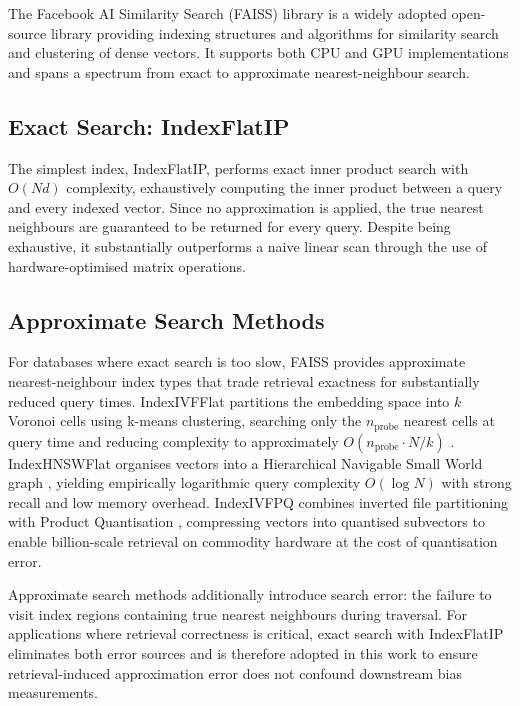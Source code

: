 The Facebook AI Similarity Search (FAISS) library \cite{Douze_2024_FAISS} is a widely
adopted open-source library providing indexing structures and algorithms for similarity
search and clustering of dense vectors. It supports both CPU and GPU implementations and
spans a spectrum from exact to approximate nearest-neighbour search.

\subsection*{Exact Search: IndexFlatIP}
\label{subsec:indexflatip}

The simplest index, IndexFlatIP, performs exact inner product search with $O(Nd)$ complexity, exhaustively computing the inner product between a query and every indexed vector. Since no approximation is applied, the true nearest neighbours are guaranteed to be returned for every query. Despite being exhaustive, it substantially outperforms a naive linear scan through the use of hardware-optimised matrix operations.

\subsection*{Approximate Search Methods}
\label{subsec:ann_methods}

For databases where exact search is too slow, FAISS provides approximate
nearest-neighbour index types that trade retrieval exactness for substantially reduced
query times. IndexIVFFlat partitions the embedding space into $k$ Voronoi cells using
k-means clustering, searching only the $n_\text{probe}$ nearest cells at query time and
reducing complexity to approximately $O(n_\text{probe} \cdot N/k)$
\cite{Jegou_2011_PQ}. IndexHNSWFlat organises vectors into a Hierarchical Navigable
Small World graph \cite{Malkov_2020_HNSW}, yielding empirically logarithmic query
complexity $O(\log N)$ with strong recall and low memory overhead. IndexIVFPQ combines
inverted file partitioning with Product Quantisation \cite{Jegou_2011_PQ}, compressing
vectors into quantised subvectors to enable billion-scale retrieval on commodity
hardware at the cost of quantisation error.

Approximate search methods additionally introduce search error: the failure to visit
index regions containing true nearest neighbours during traversal. For applications
where retrieval correctness is critical, exact search with IndexFlatIP eliminates both
error sources and is therefore adopted in this work to ensure retrieval-induced
approximation error does not confound downstream bias measurements.

